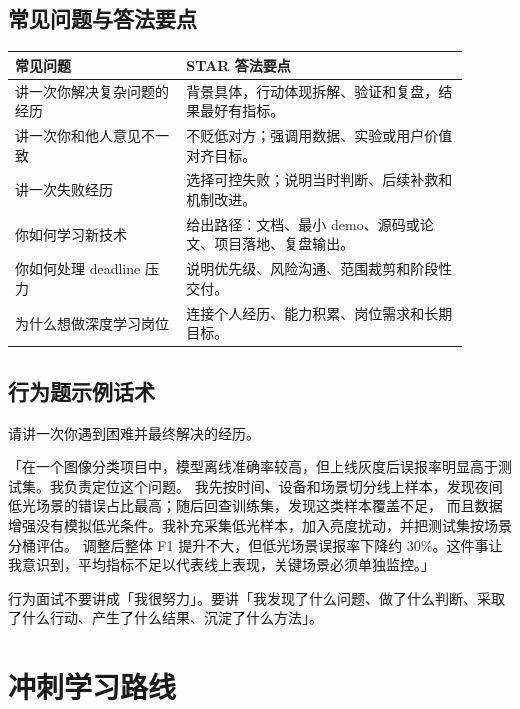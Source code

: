 \subsection{常见问题与答法要点}
\begin{table}[htbp]
  \centering
  \begin{tabular}{p{0.34\linewidth}p{0.56\linewidth}}
    \toprule
    常见问题 & STAR 答法要点 \\
    \midrule
    讲一次你解决复杂问题的经历 & 背景具体，行动体现拆解、验证和复盘，结果最好有指标。 \\
    讲一次你和他人意见不一致 & 不贬低对方；强调用数据、实验或用户价值对齐目标。 \\
    讲一次失败经历 & 选择可控失败；说明当时判断、后续补救和机制改进。 \\
    你如何学习新技术 & 给出路径：文档、最小 demo、源码或论文、项目落地、复盘输出。 \\
    你如何处理 deadline 压力 & 说明优先级、风险沟通、范围裁剪和阶段性交付。 \\
    为什么想做深度学习岗位 & 连接个人经历、能力积累、岗位需求和长期目标。 \\
    \bottomrule
  \end{tabular}
\end{table}
\subsection{行为题示例话术}
\begin{interview}
请讲一次你遇到困难并最终解决的经历。
\end{interview}
\begin{answer}
「在一个图像分类项目中，模型离线准确率较高，但上线灰度后误报率明显高于测试集。我负责定位这个问题。
我先按时间、设备和场景切分线上样本，发现夜间低光场景的错误占比最高；随后回查训练集，发现这类样本覆盖不足，
而且数据增强没有模拟低光条件。我补充采集低光样本，加入亮度扰动，并把测试集按场景分桶评估。
调整后整体 F1 提升不大，但低光场景误报率下降约 30\%。这件事让我意识到，平均指标不足以代表线上表现，关键场景必须单独监控。」
\end{answer}
\begin{quickcard}
行为面试不要讲成「我很努力」。要讲「我发现了什么问题、做了什么判断、采取了什么行动、产生了什么结果、沉淀了什么方法」。
\end{quickcard}
\section{冲刺学习路线}

